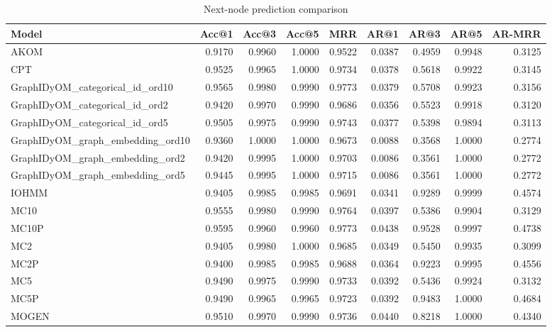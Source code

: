 \begin{table}
\caption{Next-node prediction comparison}
\label{tab:comparison}
\begin{tabular}{lrrrrrrrr}
\toprule
Model & Acc@1 & Acc@3 & Acc@5 & MRR & AR@1 & AR@3 & AR@5 & AR-MRR \\
\midrule
AKOM & 0.9170 & 0.9960 & 1.0000 & 0.9522 & 0.0387 & 0.4959 & 0.9948 & 0.3125 \\
CPT & 0.9525 & 0.9965 & 1.0000 & 0.9734 & 0.0378 & 0.5618 & 0.9922 & 0.3145 \\
GraphIDyOM_categorical_id_ord10 & 0.9565 & 0.9980 & 0.9990 & 0.9773 & 0.0379 & 0.5708 & 0.9923 & 0.3156 \\
GraphIDyOM_categorical_id_ord2 & 0.9420 & 0.9970 & 0.9990 & 0.9686 & 0.0356 & 0.5523 & 0.9918 & 0.3120 \\
GraphIDyOM_categorical_id_ord5 & 0.9505 & 0.9975 & 0.9990 & 0.9743 & 0.0377 & 0.5398 & 0.9894 & 0.3113 \\
GraphIDyOM_graph_embedding_ord10 & 0.9360 & 1.0000 & 1.0000 & 0.9673 & 0.0088 & 0.3568 & 1.0000 & 0.2774 \\
GraphIDyOM_graph_embedding_ord2 & 0.9420 & 0.9995 & 1.0000 & 0.9703 & 0.0086 & 0.3561 & 1.0000 & 0.2772 \\
GraphIDyOM_graph_embedding_ord5 & 0.9445 & 0.9995 & 1.0000 & 0.9715 & 0.0086 & 0.3561 & 1.0000 & 0.2772 \\
IOHMM & 0.9405 & 0.9985 & 0.9985 & 0.9691 & 0.0341 & 0.9289 & 0.9999 & 0.4574 \\
MC10 & 0.9555 & 0.9980 & 0.9990 & 0.9764 & 0.0397 & 0.5386 & 0.9904 & 0.3129 \\
MC10P & 0.9595 & 0.9960 & 0.9960 & 0.9773 & 0.0438 & 0.9528 & 0.9997 & 0.4738 \\
MC2 & 0.9405 & 0.9980 & 1.0000 & 0.9685 & 0.0349 & 0.5450 & 0.9935 & 0.3099 \\
MC2P & 0.9400 & 0.9985 & 0.9985 & 0.9688 & 0.0364 & 0.9223 & 0.9995 & 0.4556 \\
MC5 & 0.9490 & 0.9975 & 0.9990 & 0.9733 & 0.0392 & 0.5436 & 0.9924 & 0.3132 \\
MC5P & 0.9490 & 0.9965 & 0.9965 & 0.9723 & 0.0392 & 0.9483 & 1.0000 & 0.4684 \\
MOGEN & 0.9510 & 0.9970 & 0.9990 & 0.9736 & 0.0440 & 0.8218 & 1.0000 & 0.4340 \\
\bottomrule
\end{tabular}
\end{table}
